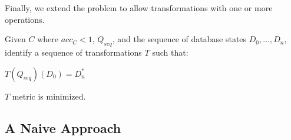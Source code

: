 Finally, we extend the problem to allow transformations with one or more operations.

\begin{problem}\label{prob:multi}
Given $C$ where $acc_C < 1$, $Q_{seq}$, and the sequence of database states $D_0,\ldots,D_n$, 
identify a sequence of transformations $T$ such that:
\begin{CompactItemize}
\item $T(Q_{seq})(D_0) = D^*_n$
\item $T$ metric is minimized.
\end{CompactItemize}
\end{problem}




\subsection{A Naive Approach}


